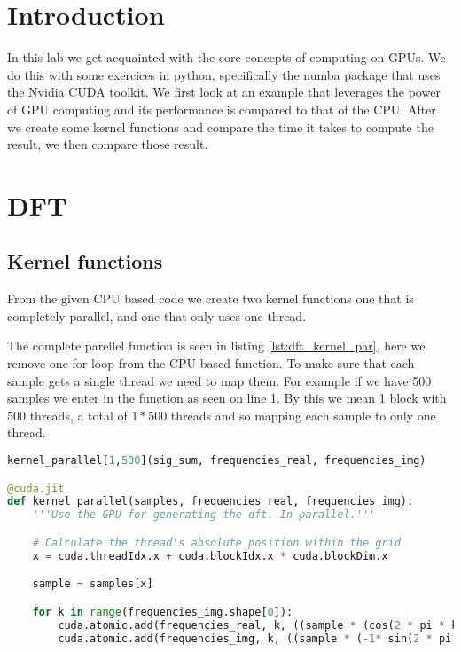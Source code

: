 
\section{Introduction}
\label{sec:introduction}
In this lab we get acquainted with the core concepts of computing on GPUs. We do this with some exercices in python, specifically the numba package that uses the Nvidia CUDA toolkit. We first look at an example that leverages the power of GPU computing and its performance is compared to that of the CPU. After we create some kernel functions and compare the time it takes to compute the result, we then compare those result.

\section{DFT}
\label{sec:dft}

\subsection{Kernel functions}
\label{subsec:kernel_functions}

From the given CPU based code we create two kernel functions one that is completely parallel, and one that only uses one thread.

The complete parellel function is seen in listing \ref{lst:dft_kernel_par}, here we remove one for loop from the CPU based function. To make sure that each sample gets a single thread we need to map them. For example if we have 500 samples we enter \code{[1,500]} in the function as seen on line 1. By this we mean 1 block with 500 threads, a total of $1*500$ threads and so mapping each sample to only one thread.

\begin{lstlisting}[language=Python,caption={DFT parallel kernel},label={lst:dft_kernel_par}]
kernel_parallel[1,500](sig_sum, frequencies_real, frequencies_img)

@cuda.jit
def kernel_parallel(samples, frequencies_real, frequencies_img):
    '''Use the GPU for generating the dft. In parallel.'''

    # Calculate the thread's absolute position within the grid
    x = cuda.threadIdx.x + cuda.blockIdx.x * cuda.blockDim.x

    sample = samples[x]

    for k in range(frequencies_img.shape[0]):
        cuda.atomic.add(frequencies_real, k, ((sample * (cos(2 * pi * k * x / N)))))
        cuda.atomic.add(frequencies_img, k, ((sample * (-1* sin(2 * pi * k * x / N) ))))
\end{lstlisting}

